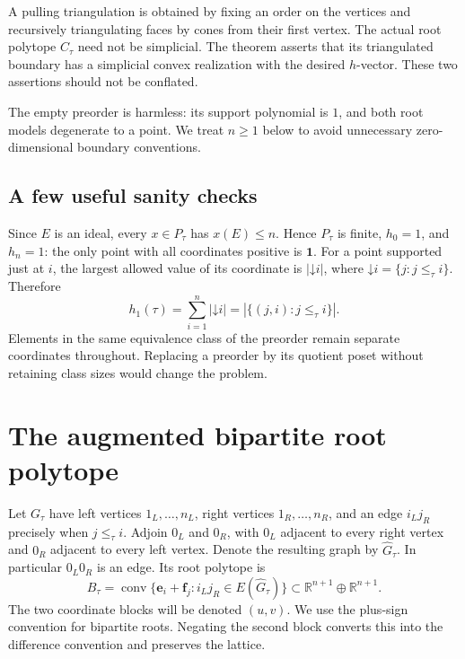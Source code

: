 \documentclass[11pt]{article}
\numberwithin{equation}{section}
\theoremstyle{definition}
\newcommand{\R}{\mathbb R}
\newcommand{\Pt}{P_\tau}
\newcommand{\conv}{\operatorname{conv}}
\newcommand{\one}{\mathbf 1}
\newcommand{\ee}{\mathbf e}
\newcommand{\ff}{\mathbf f}
\newcommand{\down}{\mathord\downarrow}
\begin{document}
A pulling triangulation is obtained by fixing an order on the vertices and
recursively triangulating faces by cones from their first vertex. The actual
root polytope $C_\tau$ need not be simplicial. The theorem asserts that its
triangulated boundary has a simplicial convex realization with the desired
$h$-vector. These two assertions should not be conflated.

The empty preorder is harmless: its support polynomial is $1$, and both root
models degenerate to a point. We treat $n\geq1$ below to avoid unnecessary
zero-dimensional boundary conventions.

\subsection{A few useful sanity checks}

Since $E$ is an ideal, every $x\in\Pt$ has $x(E)\leq n$. Hence $\Pt$ is finite,
$h_0=1$, and $h_n=1$: the only point with all coordinates positive is $\one$.
For a point supported just at $i$, the largest allowed value of its coordinate
is $|\down i|$, where $\down i=\{j:j\leq_\tau i\}$. Therefore
\begin{equation}
 h_1(\tau)=\sum_{i=1}^n|\down i|
          =|\{(j,i):j\leq_\tau i\}|.\label{eq:h1}
\end{equation}
Elements in the same equivalence class of the preorder remain separate
coordinates throughout. Replacing a preorder by its quotient poset without
retaining class sizes would change the problem.

\section{The augmented bipartite root polytope}\label{sec:bipartite}

Let $G_\tau$ have left vertices $1_L,\ldots,n_L$, right vertices
$1_R,\ldots,n_R$, and an edge $i_Lj_R$ precisely when $j\leq_\tau i$.
Adjoin $0_L$ and $0_R$, with $0_L$ adjacent to every right vertex and $0_R$
adjacent to every left vertex. Denote the resulting graph by $\widehat G_\tau$.
In particular $0_L0_R$ is an edge. Its root polytope is
\begin{equation}
 B_\tau=\conv\{\ee_i+\ff_j:i_Lj_R\in E(\widehat G_\tau)\}
       \subset\R^{n+1}\oplus\R^{n+1}.\label{eq:B}
\end{equation}
The two coordinate blocks will be denoted $(u,v)$. We use the plus-sign
convention for bipartite roots. Negating the second block converts this into
the difference convention and preserves the lattice.
\end{document}
